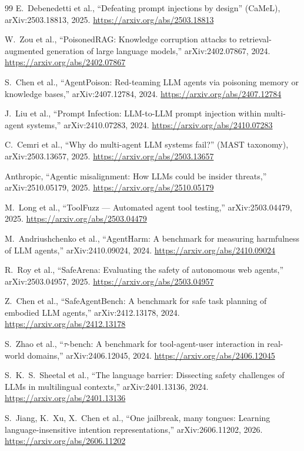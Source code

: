 \begin{thebibliography}{99}
 E.~Debenedetti et al., ``Defeating prompt injections by design''
(CaMeL), arXiv:2503.18813, 2025. \url{https://arxiv.org/abs/2503.18813}

 W.~Zou et al., ``PoisonedRAG: Knowledge corruption attacks
to retrieval-augmented generation of large language models,'' arXiv:2402.07867,
2024. \url{https://arxiv.org/abs/2402.07867}

 S.~Chen et al., ``AgentPoison: Red-teaming LLM agents via
poisoning memory or knowledge bases,'' arXiv:2407.12784, 2024.
\url{https://arxiv.org/abs/2407.12784}

 J.~Liu et al., ``Prompt Infection: LLM-to-LLM prompt
injection within multi-agent systems,'' arXiv:2410.07283, 2024.
\url{https://arxiv.org/abs/2410.07283}

 C.~Cemri et al., ``Why do multi-agent LLM systems fail?''
(MAST taxonomy), arXiv:2503.13657, 2025. \url{https://arxiv.org/abs/2503.13657}

 Anthropic, ``Agentic misalignment: How LLMs could be
insider threats,'' arXiv:2510.05179, 2025. \url{https://arxiv.org/abs/2510.05179}

 M.~Long et al., ``ToolFuzz --- Automated agent tool
testing,'' arXiv:2503.04479, 2025. \url{https://arxiv.org/abs/2503.04479}

 M.~Andriushchenko et al., ``AgentHarm: A benchmark for
measuring harmfulness of LLM agents,'' arXiv:2410.09024, 2024.
\url{https://arxiv.org/abs/2410.09024}

 R.~Roy et al., ``SafeArena: Evaluating the safety of
autonomous web agents,'' arXiv:2503.04957, 2025.
\url{https://arxiv.org/abs/2503.04957}

 Z.~Chen et al., ``SafeAgentBench: A benchmark for safe
task planning of embodied LLM agents,'' arXiv:2412.13178, 2024.
\url{https://arxiv.org/abs/2412.13178}

 S.~Zhao et al., ``$\tau$-bench: A benchmark for tool-agent-user
interaction in real-world domains,'' arXiv:2406.12045, 2024.
\url{https://arxiv.org/abs/2406.12045}

 S.~K.~S.~Sheetal et al., ``The language barrier: Dissecting
safety challenges of LLMs in multilingual contexts,'' arXiv:2401.13136, 2024.
\url{https://arxiv.org/abs/2401.13136}

 S.~Jiang, K.~Xu, X.~Chen et al., ``One jailbreak, many
tongues: Learning language-insensitive intention representations,''
arXiv:2606.11202, 2026. \url{https://arxiv.org/abs/2606.11202}


\end{thebibliography}
